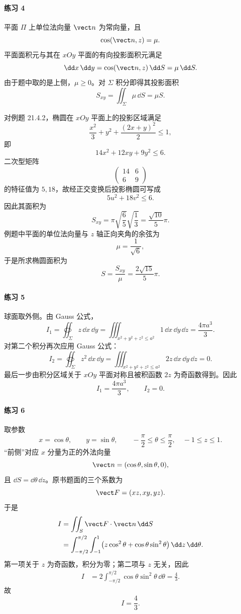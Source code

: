 \paragraph{练习 4}
\begin{xsolution}
平面 $\Pi$ 上单位法向量 $\vect n$ 为常向量，且
\[
  \cos(\vect n,z)=\mu.
\]
平面面积元与其在 $xOy$ 平面的有向投影面积元满足
\[
  \dd x\,\dd y=\cos(\vect n,z)\,\dd S=\mu\,\dd S.
\]
由于题中取的是上侧，$\mu\ge0$。对 $\Sigma$ 积分即得其投影面积
\[
  S_{xy}=\iint_\Sigma\mu\,\dd S=\mu S.
\]

对例题 21.4.2，椭圆在 $xOy$ 平面上的投影区域满足
\[
  \frac{x^2}{3}+y^2+\frac{(2x+y)^2}{2}\le1,
\]
即
\[
  14x^2+12xy+9y^2\le6.
\]
二次型矩阵
\[
  \begin{pmatrix}14&6\\6&9\end{pmatrix}
\]
的特征值为 $5,18$，故经正交变换后投影椭圆可写成
\[
  5u^2+18v^2\le6.
\]
因此其面积为
\[
  S_{xy}=\pi\sqrt{\frac65}\sqrt{\frac13}
  =\frac{\sqrt{10}}5\pi.
\]
例题中平面的单位法向量与 $z$ 轴正向夹角的余弦为
\[
  \mu=\frac1{\sqrt6},
\]
于是所求椭圆面积为
\[
  \boxed{S=\frac{S_{xy}}\mu=\frac{2\sqrt{15}}5\pi}.
\]
\end{xsolution}

\paragraph{练习 5}
\begin{xsolution}
球面取外侧。由 Gauss 公式，
\[
  I_1=\oiint_\Sigma z\,\dd x\,\dd y
  =\iiint_{x^2+y^2+z^2\le a^2}1\,\dd x\,\dd y\,\dd z
  =\frac{4\pi a^3}{3}.
\]
对第二个积分再次应用 Gauss 公式：
\[
  I_2=\oiint_\Sigma z^2\,\dd x\,\dd y
  =\iiint_{x^2+y^2+z^2\le a^2}2z\,\dd x\,\dd y\,\dd z=0.
\]
最后一步由积分区域关于 $xOy$ 平面对称且被积函数 $2z$ 为奇函数得到。因此
\[
  \boxed{I_1=\frac{4\pi a^3}{3},\qquad I_2=0}.
\]
\end{xsolution}

\paragraph{练习 6}
\begin{xsolution}
取参数
\[
  x=\cos\theta,\qquad y=\sin\theta,\qquad
  -\frac\pi2\le\theta\le\frac\pi2,\quad -1\le z\le1.
\]
“前侧”对应 $x$ 分量为正的外法向量
\[
  \vect n=(\cos\theta,\sin\theta,0),
\]
且 $\dd S=\dd\theta\,\dd z$。原书题面的三个系数为
\[
  \vect F=(xz,xy,yz).
\]
于是
\begin{align*}
I
&=\iint_S\vect F\cdot\vect n\,\dd S\\
&=\int_{-\pi/2}^{\pi/2}\int_{-1}^{1}
  \bigl(z\cos^2\theta+\cos\theta\sin^2\theta\bigr)
  \,\dd z\,\dd\theta.
\end{align*}
第一项关于 $z$ 为奇函数，积分为零；第二项与 $z$ 无关，因此
\begin{align*}
I
&=2\int_{-\pi/2}^{\pi/2}\cos\theta\sin^2\theta\,\dd\theta
=\frac43.
\end{align*}
故
\[
  \boxed{I=\frac43}.
\]
\end{xsolution}

